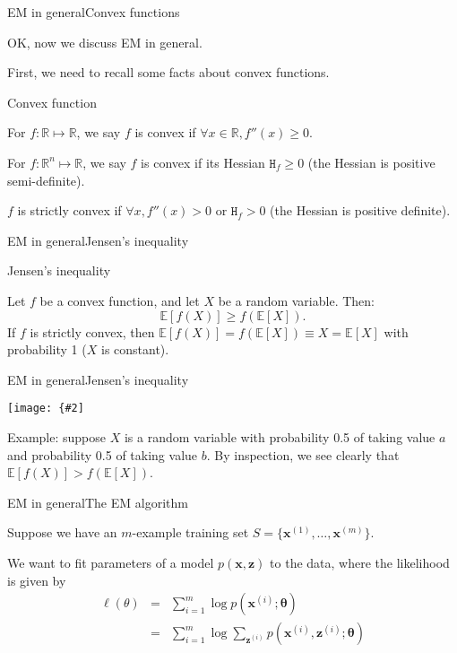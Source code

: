 \documentclass{beamer}
\renewcommand{\vec}[1]{\boldsymbol{#1}}
\newcommand{\mat}[1]{\mathtt{#1}}
\def\Rset{\mathbb{R}}
\def\Expec{\mathbb{E}}
\newcommand{\myfig}[3]{\centerline{\texttt{[image: \{\#2]}}}
    \centerline{\scriptsize #3}}
\begin{document}
\begin{frame}{EM in general}{Convex functions}

  OK, now we discuss EM in general.

  \medskip

  First, we need to recall some facts about convex functions.

  \begin{block}{Convex function}

    For $f : \Rset \mapsto \Rset$, we say $f$ is \alert{convex} if
    $\forall x \in \Rset, f''(x) \ge 0.$

    For $f : \Rset^n \mapsto \Rset$, we say $f$ is convex if its
    Hessian $\mat{H}_f \ge 0$ (the Hessian is positive semi-definite).

    $f$ is \alert{strictly convex} if $\forall x, f''(x) > 0$ or
    $\mat{H}_f > 0$ (the Hessian is positive definite).
    
  \end{block}

\end{frame}


\begin{frame}{EM in general}{Jensen's inequality}

  \begin{block}{Jensen's inequality}

    Let $f$ be a convex function, and let $X$ be a random variable.
    Then:
    \[ \Expec[f(X)] \ge f(\Expec[X]). \]
    If $f$ is strictly convex, then $\Expec[f(X)] = f(\Expec[X])
    \equiv X = \Expec[X]$ with probability 1 ($X$ is constant).

  \end{block}
  
\end{frame}


\begin{frame}{EM in general}{Jensen's inequality}

  \myfig{2.5in}{jensen}{Ng (2017), CS 229 lecture notes, set 8.}

  \medskip
  
  Example: suppose $X$ is a random variable with probability 0.5 of
  taking value $a$ and probability 0.5 of taking value $b$. By inspection,
  we see clearly that $\Expec[f(X)] > f(\Expec[X])$.

\end{frame}


\begin{frame}{EM in general}{The EM algorithm}

  Suppose we have an $m$-example training set $S = \{ \vec{x}^{(1)},
  \ldots, \vec{x}^{(m)} \}$.

  \medskip

  We want to fit parameters of a model $p(\vec{x},\vec{z})$ to the data,
  where the likelihood is given by
  \begin{eqnarray*}
    \ell(\mat{\theta}) & = & \sum_{i=1}^m \log p(\vec{x}^{(i)}; \vec{\theta}) \\
    & = & \sum_{i=1}^m \log \sum_{\vec{z}^{(i)}} p(\vec{x}^{(i)},\vec{z}^{(i)};\vec{\theta})
  \end{eqnarray*}

\end{frame}
\end{document}
